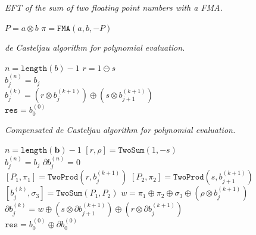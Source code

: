 \documentclass[letterpaper,10pt]{article}
\begin{document}
\begin{algorithm}[H]
  \caption{\textit{EFT of the sum of two floating point numbers with a FMA.}}

  \begin{algorithmic}
      \State \(P = a \otimes b\)
      \State \(\pi = \mathtt{FMA}(a, b, -P)\)
    \EndFunction
  \end{algorithmic}
\end{algorithm}

\begin{algorithm}[H]
  \caption{\textit{de Casteljau algorithm for polynomial evaluation.}}

  \begin{algorithmic}
      \State \(n = \texttt{length}(b) - 1\)
      \State \(r = 1 \ominus s\)
      \\
        \State \(b_j^{(n)} = b_j\)
      \EndFor
      \\
          \State \(b_j^{(k)} = \left(r \otimes b_j^{(k + 1)}\right) \oplus
              \left(s \otimes b_{j + 1}^{(k + 1)}\right)\)
        \EndFor
      \EndFor
      \\
      \State \(\mathtt{res} = b_0^{(0)}\)
    \EndFunction
  \end{algorithmic}
\end{algorithm}

\begin{algorithm}[H]
  \caption{\textit{Compensated de Casteljau algorithm for polynomial evaluation.}}

  \begin{algorithmic}
      \State \(n = \texttt{length}(\mathbf{b}) - 1\)
      \State \(\left[r, \rho\right] = \mathtt{TwoSum}(1, -s)\)
      \\
        \State \(b_j^{(n)} = b_j\)
        \State \(\partial b_j^{(n)} = 0\)
      \EndFor
      \\
          \State \(\left[P_1, \pi_1\right] = \mathtt{TwoProd}\left(
              r, b_j^{(k + 1)}\right)\)
          \State \(\left[P_2, \pi_2\right] = \mathtt{TwoProd}\left(
              s, b_{j + 1}^{(k + 1)}\right)\)
          \State \(\left[b_j^{(k)}, \sigma_3\right] = \mathtt{TwoSum}(
              P_1, P_2)\)
          \State \(w = \pi_1 \oplus \pi_2 \oplus \sigma_3 \oplus
              \left(\rho \otimes b_j^{(k + 1)}\right)\)
          \State \(\partial b_j^{(k)} = w \oplus \left(s \otimes
              \partial b_{j + 1}^{(k + 1)}
              \right) \oplus \left(r \otimes \partial b_j^{(k + 1)}\right)\)
        \EndFor
      \EndFor
      \\
      \State \(\mathtt{res} = b_0^{(0)} \oplus \partial b_0^{(0)}\)
    \EndFunction
  \end{algorithmic}
\end{algorithm}
\end{document}
